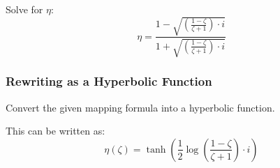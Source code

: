 



Solve for \(\eta\):
\[
\eta = \frac{1 - \sqrt{\left( \frac{1 - \zeta}{\zeta + 1} \right) \cdot i}}{1 + \sqrt{\left( \frac{1 - \zeta}{\zeta + 1} \right) \cdot i}}
\]

\subsubsection{Rewriting as a Hyperbolic Function}

Convert the given mapping formula into a hyperbolic function.







This can be written as:
\[
\eta(\zeta) = \tanh \left( \frac{1}{2} \log \left( \frac{1 - \zeta}{\zeta + 1} \right) \cdot i \right)
\]

